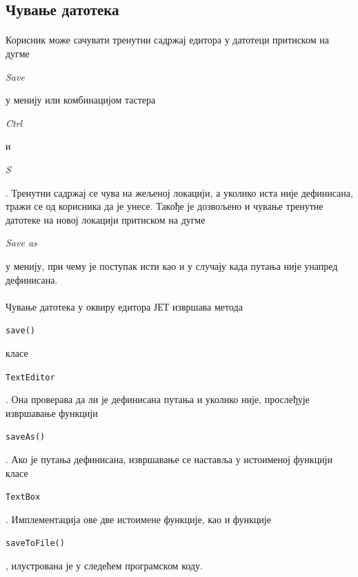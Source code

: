 \documentclass[12pt,oneside]{memoir}
\begin{document}
\subsection{Чување датотека}
\paragraph{}
Корисник може сачувати тренутни садржај едитора у датотеци притиском на дугме 
\begin{latinica}\textit{Save}\end{latinica} у менију или комбинацијом
тастера \begin{latinica}\textit{Ctrl}\end{latinica} и
\begin{latinica}\textit{S}\end{latinica}. Тренутни садржај се чува на 
жељеној локацији, а уколико иста није дефинисана, тражи се од корисника
да је унесе. Такође је дозвољено и чување тренутне датотеке на новој локацији
притиском на дугме \begin{latinica}\textit{Save as}\end{latinica} у менију, при
чему је поступак исти као и у случају када путања није унапред дефинисана.

\paragraph{}
Чување датотека у оквиру едитора ЈЕТ извршава метода
\begin{latinica}\verb|save()|\end{latinica} класе \begin{latinica}\verb|TextEditor|\end{latinica}. Она проверава да ли је дефинисана 
путања и уколико није, прослеђује извршавање функцији \begin{latinica}\verb|saveAs()|\end{latinica}. Ако је путања дефинисана, извршавање
се наставља у истоименој функцији класе  \begin{latinica}\verb|TextBox|\end{latinica}.
Имплементација ове две истоимене функције, као и функције \begin{latinica}\verb|saveToFile()|\end{latinica}, илустрована је у следећем програмском коду.
\end{document}
